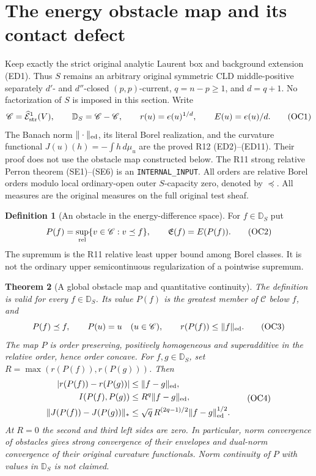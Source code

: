\documentclass[11pt,a4paper]{article}
\numberwithin{equation}{section}
\newtheorem{theorem}{Theorem}[section]
\theoremstyle{definition}
\newtheorem{definition}[theorem]{Definition}
\theoremstyle{remark}
\begin{document}


\section{The energy obstacle map and its contact defect}
\label{sec:r12-energy-obstacles}

Keep exactly the strict original analytic Laurent box and background
extension \textup{(ED1)}.  Thus $S$ remains an arbitrary original
symmetric CLD middle-positive separately $d'$- and $d''$-closed
$(p,p)$-current, $q=n-p\ge1$, and $d=q+1$.  No factorization of
$S$ is imposed in this section.  Write
\[
 \mathscr C=\widehat{\mathcal E}^{1}_{\rm str}(V),\qquad
 \mathbb D_S=\mathscr C-\mathscr C,\qquad
 r(u)=e(u)^{1/d},\qquad E(u)=e(u)/d.
 \tag{OC1}
\]
The Banach norm $\|\cdot\|_{\rm ed}$, its literal Borel
realization, and the curvature functional
$J(u)(h)=-\int h\,d\widehat\mu_u$ are the proved R12
\textup{(ED2)--(ED11)}.  Their proof does not use the obstacle
map constructed below.  The R11 strong relative Perron theorem
\textup{(SE1)--(SE6)} is an \texttt{INTERNAL\_INPUT}.
All orders are relative Borel orders modulo local ordinary-open
outer $S$-capacity zero, denoted by $\preceq$.  All measures are
the original measures on the full original test sheaf.

\begin{definition}[An obstacle in the energy-difference space]
\label{def:r12-energy-obstacle}
For $f\in\mathbb D_S$ put
\[
 P(f)=\sup_{\rm rel}\{v\in\mathscr C:v\preceq f\},
 \qquad \mathfrak E(f)=E(P(f)).
 \tag{OC2}
\]
The supremum is the R11 relative least upper bound among Borel
classes.  It is not the ordinary upper semicontinuous
regularization of a pointwise supremum.
\end{definition}

\begin{theorem}[A global obstacle map and quantitative continuity]
\label{thm:r12-global-energy-obstacle}
The definition is valid for every $f\in\mathbb D_S$.  Its value
$P(f)$ is the greatest member of $\mathscr C$ below $f$, and
\[
 P(f)\preceq f,\qquad P(u)=u\quad(u\in\mathscr C),\qquad
 r(P(f))\le\|f\|_{\rm ed}.
 \tag{OC3}
\]
The map $P$ is order preserving, positively homogeneous and
superadditive in the relative order, hence order concave.
For $f,g\in\mathbb D_S$, set
$R=\max(r(P(f)),r(P(g)))$.  Then
\[
 \begin{split}
 |r(P(f))-r(P(g))|&\le\|f-g\|_{\rm ed},\\
 I(P(f),P(g))&\le R^q\|f-g\|_{\rm ed},\\
 \|J(P(f))-J(P(g))\|_*
       &\le\sqrt q\,R^{(2q-1)/2}\|f-g\|_{\rm ed}^{1/2}.
 \end{split}
 \tag{OC4}
\]
At $R=0$ the second and third left sides are zero.  In
particular, norm convergence of obstacles gives strong
convergence of their envelopes and dual-norm convergence of
their original curvature functionals.  Norm continuity of
$P$ with values in $\mathbb D_S$ is not claimed.
\end{theorem}
\end{document}
